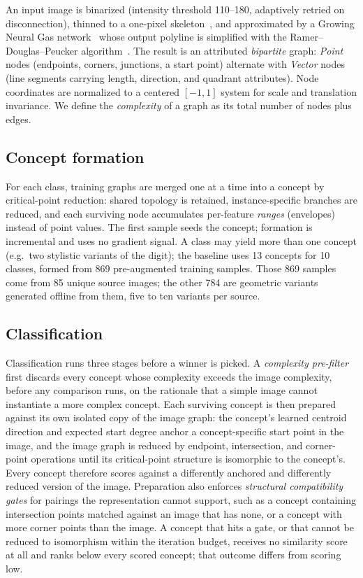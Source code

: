\documentclass[conference]{IEEEtran}
\begin{document}
An input image is binarized (intensity threshold 110--180, adaptively
retried on disconnection), thinned to a one-pixel
skeleton~\cite{zhang1984fast}, and approximated by a Growing Neural Gas
network~\cite{fritzke1995growing} whose output polyline is simplified with
the Ramer--Douglas--Peucker algorithm~\cite{douglas1973algorithms}. The
result is an attributed \emph{bipartite} graph: \emph{Point} nodes
(endpoints, corners, junctions, a start point) alternate with \emph{Vector}
nodes (line segments carrying length, direction, and quadrant attributes).
Node coordinates are normalized to a centered $[-1,1]$ system for scale
and translation invariance. We define the \emph{complexity} of a graph as
its total number of nodes plus edges.

\subsection{Concept formation}

For each class, training graphs are merged one at a time into a concept by
critical-point reduction: shared topology is retained, instance-specific
branches are reduced, and each surviving node accumulates per-feature
\emph{ranges} (envelopes) instead of point values. The first sample seeds
the concept; formation is incremental and uses no gradient
signal. A class may yield more than one concept (e.g.\ two stylistic
variants of the digit); the baseline uses 13 concepts for 10 classes,
formed from 869 pre-augmented training samples. Those 869 samples come from
85 unique source images; the other 784 are geometric variants generated
offline from them, five to ten variants per source.

\subsection{Classification}

Classification runs three stages before a winner is picked. A
\emph{complexity pre-filter} first discards every concept whose complexity
exceeds the image complexity, before any comparison runs, on the rationale
that a simple image cannot instantiate a more complex concept. Each
surviving concept is then prepared against its own isolated copy of the
image graph: the concept's learned centroid direction and expected start
degree anchor a concept-specific start point in the image, and the image
graph is reduced by endpoint, intersection, and corner-point operations
until its critical-point structure is isomorphic to the concept's. Every
concept therefore scores against a differently anchored and differently
reduced version of the image. Preparation also enforces \emph{structural
compatibility gates} for pairings the representation cannot support, such as
a concept containing intersection points matched against an image that has
none, or a concept with more corner points than the image. A concept that
hits a gate, or that cannot be reduced to isomorphism within the iteration
budget, receives no similarity score at all and ranks below every scored
concept; that outcome differs from scoring low.
\end{document}
